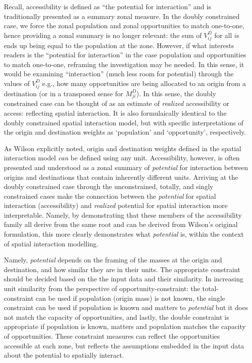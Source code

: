 \documentclass[
]{article}
\begin{document}
Recall, accessibility is defined as ``the potential for interaction''
and is traditionally presented as a summary zonal measure. In the doubly
constrained case, we force the zonal population and zonal opportunities
to match one-to-one, hence providing a zonal summary is no longer
relevant: the sum of \(V_{ij}^D\) for all \(i\)s ends up being equal to
the population at the zone. However, if what interests readers is the
``potential for interaction'' in the case population and opportunities
to match one-to-one, reframing the investigation may be needed. In this
sense, it would be examining ``interaction'' (much less room for
potential) through the values of \(V_{ij}^D\) e.g., how many
opportunities are being allocated to an origin from a destination (or in
a transposed sense for \(M_{ji}^D\)). In this sense, the doubly
constrained case can be thought of as an estimate of \emph{realized}
accessibility or access: reflecting spatial interaction. It is also
formulaically identical to the doubly constrained spatial interaction
model, but with specific interpretations of the origin and destination
weights as `population' and `opportunity', respectively.

As Wilson explicitly noted, origin and destination weights defined in
the spatial interaction model \emph{can} be defined using any unit.
Accessibility, however, is often presented and understood as a zonal
summary of \emph{potential} for interaction between origins and
destinations that contain inherently different units. Arriving at the
doubly constrained case through the unconstrained, totally, and singly
constrained cases make the connection between the \emph{potential} for
spatial interaction (accessibility) and \emph{realized} potential for
spatial interaction more interpretable. Namely, by demonstrating that
these members of the accessibility family all derive from the same root
and can be derived from Wilson's original formulation, this more clearly
demonstrates what \emph{potential} is, within the context of spatial
interaction modelling.

Namely, \emph{potential} depends on the framing of the masses at the
origin and destination, and how similar they are in their units. The
appropriate constraint should be decided based on the the input data and
their similarity. In increasing unit similarity from the perspective of
opportunity-constraint: the total-constraint can be used if population
(origin mass) is not known, the single constraint can be used if
population is known and matters to \emph{potential} but it does not
match the capacity of opportunities, and lastly, the double constraint
is appropriate if population is known, matters and population matches
the capacity of opportunities. These constraint measures can reflect the
opportunities accessible at each zone, but reflects the assumptions
embedded in the input data about the potential to spatially interact.
\end{document}
